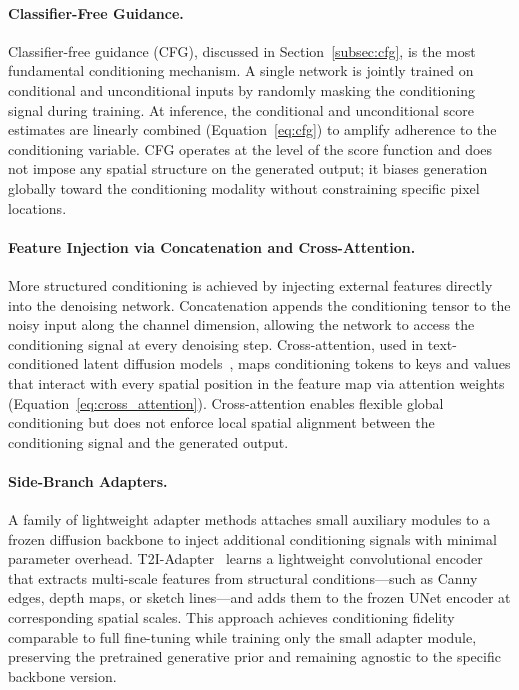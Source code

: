 \paragraph{Classifier-Free Guidance.}
Classifier-free guidance (CFG), discussed in Section~\ref{subsec:cfg}, is the most fundamental conditioning mechanism. A single network is jointly trained on conditional and unconditional inputs by randomly masking the conditioning signal during training. At inference, the conditional and unconditional score estimates are linearly combined (Equation~\ref{eq:cfg}) to amplify adherence to the conditioning variable. CFG operates at the level of the score function and does not impose any spatial structure on the generated output; it biases generation globally toward the conditioning modality without constraining specific pixel locations.

\paragraph{Feature Injection via Concatenation and Cross-Attention.}
More structured conditioning is achieved by injecting external features directly into the denoising network. Concatenation appends the conditioning tensor to the noisy input along the channel dimension, allowing the network to access the conditioning signal at every denoising step. Cross-attention, used in text-conditioned latent diffusion models~\cite{rombach2022highresolution}, maps conditioning tokens to keys and values that interact with every spatial position in the feature map via attention weights (Equation~\ref{eq:cross_attention}). Cross-attention enables flexible global conditioning but does not enforce local spatial alignment between the conditioning signal and the generated output.

\paragraph{Side-Branch Adapters.}
A family of lightweight adapter methods attaches small auxiliary modules to a frozen diffusion backbone to inject additional conditioning signals with minimal parameter overhead. T2I-Adapter~\cite{mou2024t2i} learns a lightweight convolutional encoder that extracts multi-scale features from structural conditions---such as Canny edges, depth maps, or sketch lines---and adds them to the frozen UNet encoder at corresponding spatial scales. This approach achieves conditioning fidelity comparable to full fine-tuning while training only the small adapter module, preserving the pretrained generative prior and remaining agnostic to the specific backbone version.

